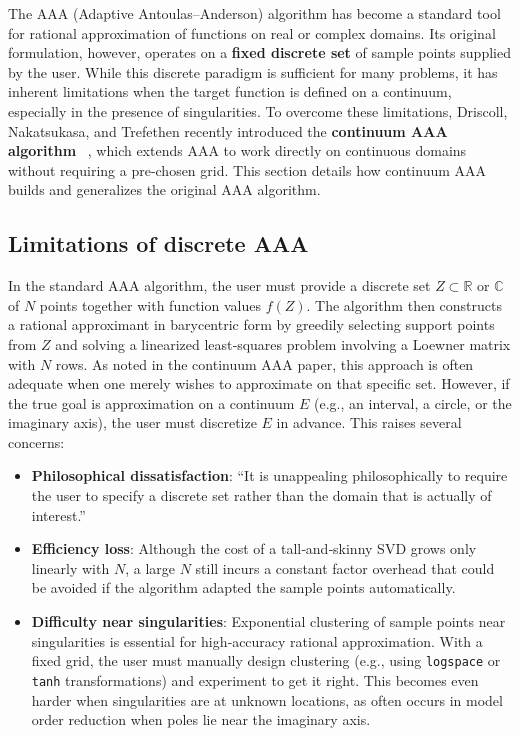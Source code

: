 \documentclass{article}
\begin{document}
The AAA (Adaptive Antoulas–Anderson) algorithm has become a standard tool for rational approximation of functions on real or complex domains. Its original formulation, however, operates on a \textbf{fixed discrete set} of sample points supplied by the user. While this discrete paradigm is sufficient for many problems, it has inherent limitations when the target function is defined on a continuum, especially in the presence of singularities. To overcome these limitations, Driscoll, Nakatsukasa, and Trefethen recently introduced the \textbf{continuum AAA algorithm} ~\cite{ref2}, which extends AAA to work directly on continuous domains without requiring a pre‑chosen grid. This section details how continuum AAA builds and generalizes the original AAA algorithm.

\subsection{Limitations of discrete AAA}

In the standard AAA algorithm, the user must provide a discrete set \(Z\subset\mathbb{R}\) or \(\mathbb{C}\) of \(N\) points together with function values \(f(Z)\). The algorithm then constructs a rational approximant in barycentric form by greedily selecting support points from \(Z\) and solving a linearized least‑squares problem involving a Loewner matrix with \(N\) rows. As noted in the continuum AAA paper, this approach is often adequate when one merely wishes to approximate on that specific set. However, if the true goal is approximation on a continuum \(E\) (e.g., an interval, a circle, or the imaginary axis), the user must discretize \(E\) in advance. This raises several concerns:

\begin{itemize}
    \item \textbf{Philosophical dissatisfaction}: ``It is unappealing philosophically to require the user to specify a discrete set rather than the domain that is actually of interest.''
    \item \textbf{Efficiency loss}: Although the cost of a tall‑and‑skinny SVD grows only linearly with \(N\), a large \(N\) still incurs a constant factor overhead that could be avoided if the algorithm adapted the sample points automatically.
    \item \textbf{Difficulty near singularities}: Exponential clustering of sample points near singularities is essential for high‑accuracy rational approximation. With a fixed grid, the user must manually design clustering (e.g., using \texttt{logspace} or \texttt{tanh} transformations) and experiment to get it right. This becomes even harder when singularities are at unknown locations, as often occurs in model order reduction when poles lie near the imaginary axis.
\end{itemize}
\end{document}
